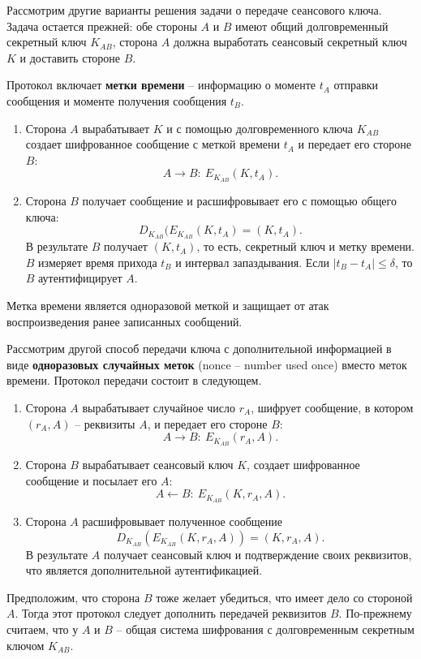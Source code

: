 \documentclass[10pt,a4paper]{book}
\begin{document}
Рассмотрим другие варианты решения задачи о передаче сеансового ключа.
Задача остается прежней: обе стороны $A$ и $B$ имеют общий долговременный секретный ключ $K_{AB}$, сторона $A$ должна  выработать сеансовый секретный ключ $K$ и доставить стороне $B$.

Протокол включает \textbf{метки времени} -- информацию о моменте $t_A$ отправки сообщения и моменте получения сообщения $t_B$.

\begin{enumerate}
    \item  Сторона $A$ вырабатывает $K$ и с помощью долговременного ключа $K_{AB}$ создает шифрованное сообщение с меткой времени $t_A$ и передает его стороне $B$:
            \[ A \rightarrow B: ~ E_{K_{AB}}(K, t_A). \]
    \item Сторона $B$ получает сообщение и расшифровывает его с помощью общего ключа:
            \[ D_{K_{AB}}( E_{K_{AB}}( K, t_A) = (K, t_A). \]
        В результате $B$ получает $(K, t_A)$, то есть, секретный ключ и метку времени. $B$ измеряет время прихода $t_B$ и интервал запаздывания. Если $|t_B - t_A| \le \delta$, то $B$ аутентифицирует $A$.
\end{enumerate}
Метка времени является одноразовой меткой и защищает от атак воспроизведения ранее записанных сообщений.

Рассмотрим другой способ передачи ключа с дополнительной информацией в виде \textbf{одноразовых случайных меток} (nonce -- number used once) вместо меток времени. Протокол передачи состоит в следующем.

\begin{enumerate}
    \item Сторона $A$ вырабатывает случайное число $r_A$, шифрует сообщение, в котором  $(r_A, A)$ -- реквизиты $A$, и передает его стороне $B$:
            \[ A \rightarrow B: ~ E_{K_{AB}}(r_A, A). \]
    \item Сторона $B$ вырабатывает сеансовый ключ $K$, создает шифрованное сообщение и посылает его $A$:
            \[ A \leftarrow B: ~ E_{K_{AB}}(K, r_A, A). \]
    \item Сторона $A$ расшифровывает полученное сообщение
            \[ D_{K_{AB}}( E_{K_{AB}}( K, r_A, A)) = (K, r_A, A). \]
        В результате $A$ получает сеансовый ключ и подтверждение своих реквизитов, что является дополнительной аутентификацией.
\end{enumerate}

Предположим, что сторона $B$ тоже желает убедиться, что имеет дело со стороной $A$. Тогда этот протокол следует дополнить передачей реквизитов $B$. По-прежнему считаем, что у $A$ и $B$ -- общая система шифрования с долговременным секретным ключом $K_{AB}$.
\end{document}
